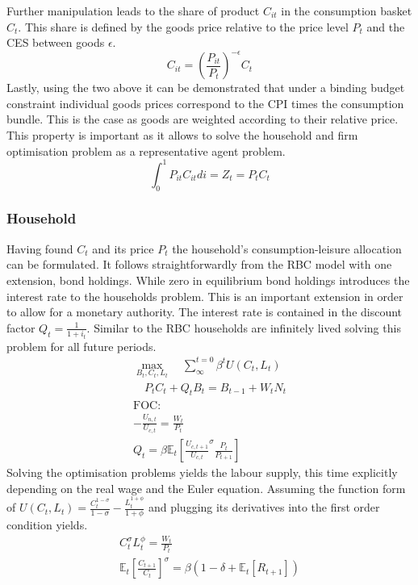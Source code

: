 \documentclass[12pt,a4paper,english]{article} %
\newcommand{\E}{\mathbb{E}} %
\begin{document}
	Further manipulation leads to the share of product $C_{it}$ in the consumption basket $C_t$. This share is defined by the goods price relative to the price level $P_t$ and the CES between goods $\epsilon$.
	\begin{equation} \label{eq: cshare}
		C_{it} = \left( \frac{P_{it}}{P_t} \right)^{- \epsilon} C_t
	\end{equation}
	Lastly, using the two above it can be demonstrated that under a binding budget constraint individual goods prices correspond to the CPI times the consumption bundle. This is the case as goods are weighted according to their relative price. This property is important as it allows to solve the household and firm optimisation problem as a representative agent problem.
	\begin{equation}
		\int_{0}^{1} P_{it} C_{it} di = Z_t = P_t C_t
	\end{equation}

	\subsubsection{Household}
	Having found $C_t$ and its price $P_t$ the household's consumption-leisure allocation can be formulated. It follows straightforwardly from the RBC model with one extension, bond holdings. While zero in equilibrium bond holdings introduces the interest rate to the households problem. This is an important extension in order to allow for a monetary authority. The interest rate is contained in the discount factor $Q_t = \frac{1}{1+i_t}$.
	Similar to the RBC households are infinitely lived solving this problem for all future periods. 
	\begin{equation}
		\begin{aligned}
			\max_{B_t, C_t, L_t} \quad \sum_{\infty}^{t=0} \beta^{t} U(C_{t}, L_{t}) \\
			\quad P_t C_t + Q_t B_t = B_{t-1} + W_t N_t \\
			\textrm{FOC:} \\
				- \frac{U_{n,t}}{U_{c, t}} = \frac{W_t}{P_t}\\
				Q_t = \beta \E_t \left[ \frac{U_{c, t+1}}{U_{c,t}}^\sigma \frac{P_t}{P_{t+1}} \right] 			
		\end{aligned}
	\end{equation}
	Solving the optimisation problems yields the labour supply, this time explicitly depending on the real wage and the Euler equation. Assuming the function form of $		U(C_t, L_t) = \frac{C_t^{1-\sigma}}{{1-\sigma}} - \frac{L_t^{1+\phi}}{1+\phi}$ and plugging its derivatives into the first order condition yields.
		\begin{equation}
		\begin{aligned}
			C_t^\sigma L_t^\phi	= \frac{W_t}{P_t} \\
			\E_t \left[ \frac{C_{t+1}}{C_t} \right]^\sigma = \beta ( 1 - \delta  + \E_t [R_{t+1}] )
		\end{aligned}
	\end{equation}
		
\end{document}
